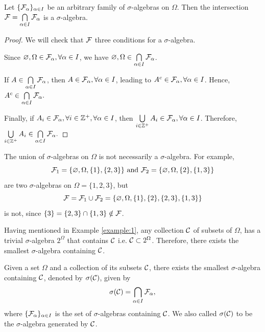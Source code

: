 \begin{proposition}
  Let $\{\mathcal{F}_\alpha\}_{\alpha\in I}$ be an arbitrary family of $\sigma$-algebras on $\Omega$. Then the intersection $\mathcal{F}=\bigcap\limits_{\alpha\in I}\mathcal{F}_\alpha$ is a $\sigma$-algebra.
\end{proposition}

\begin{proof}
  We will check that $\mathcal{F}$ three conditions for a $\sigma$-algebra.

  Since $\varnothing,\Omega\in\mathcal{F}_\alpha,\forall\alpha\in I$, we have $\varnothing,\Omega\in\bigcap\limits_{\alpha\in I}\mathcal{F}_\alpha$.

  If $A\in\bigcap\limits_{\alpha\in I}\mathcal{F}_\alpha$, then $A\in \mathcal{F}_\alpha,\forall\alpha\in I$, leading to $A^c\in \mathcal{F}_\alpha,\forall\alpha\in I$. Hence, $A^c\in\bigcap\limits_{\alpha\in I}\mathcal{F}_\alpha.$

  Finally, if $A_i\in\mathcal{F}_\alpha,\forall i\in\mathbb{Z}^+,\forall \alpha\in I$, then $\bigcup\limits_{i\in\mathbb{Z}^+}A_i\in\mathcal{F}_\alpha,\forall\alpha\in I$. Therefore,
  $\bigcup\limits_{i\in\mathbb{Z}^+}A_i\in\bigcap\limits_{\alpha\in I}\mathcal{F}_\alpha.$
\end{proof}

\begin{remark}
  The union of $\sigma$-algebras on $\Omega$ is not necessarily a $\sigma$-algebra. For example,
  $$\mathcal{F}_1=\{\varnothing,\Omega, \{1\}, \{2,3\}\} \text{ and } \mathcal{F}_2=\{\varnothing,\Omega, \{2\}, \{1,3\}\}$$
  are two $\sigma$-algebras on $\Omega=\{1,2,3\}$, but
  $$\mathcal{F}=\mathcal{F}_1\cup\mathcal{F}_2=\{\varnothing,\Omega,\{1\},\{2\},\{2,3\},\{1,3\}\}$$ is not, since $\{3\}=\{2,3\}\cap\{1,3\}\notin \mathcal{F}$.
\end{remark}

Having mentioned in Example \ref{example:1}, any collection $\mathcal{C}$ of subsets of $\Omega$, has a trivial $\sigma$-algebra $2^\Omega$ that contains $\mathcal{C}$ i.e. $\mathcal{C}\subset2^\Omega$. Therefore, there exists the smallest $\sigma$-algebra containing $\mathcal{C}$.

\begin{theorem}
  \label{theorem:generated-sigma-algebra}
  Given a set $\Omega$ and a collection of its subsets $\mathcal{C}$, there exists the smallest $\sigma$-algebra containing $\mathcal{C}$, denoted by $\sigma(\mathcal{C})$, given by
  $$\sigma(\mathcal{C})=\bigcap\limits_{\alpha\in I}\mathcal{F}_\alpha,$$
  where $\{\mathcal{F}_\alpha\}_{\alpha\in I}$ is the set of $\sigma$-algebras containing $\mathcal{C}$. We also called $\sigma(\mathcal{C})$ to be the $\sigma$-algebra generated by $\mathcal{C}$.
\end{theorem}

